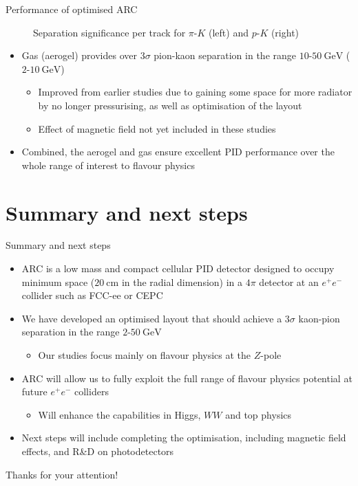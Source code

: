 \documentclass{beamer}
\begin{document}
\begin{frame}{Performance of optimised ARC}
\begin{figure}
\begin{subfigure}{0.5\textwidth}
    \end{subfigure}
    \vspace{-0.4cm}
    \caption{Separation significance per track for $\pi$-$K$ (left) and $p$-$K$ (right)}
  \end{figure}
  \vspace{-0.4cm}
  \begin{itemize}
    \setlength\itemsep{0.0em}
    \item{Gas (aerogel) provides over $3\sigma$ pion-kaon separation in the range $10$-$\SI{50}{\giga\eV}$ ($2$-$\SI{10}{\giga\eV}$)}
    \begin{itemize}
      \item{Improved from earlier studies due to gaining some space for more radiator by no longer pressurising, as well as optimisation of the layout}
      \item{Effect of magnetic field not yet included in these studies}
    \end{itemize}
    \item{Combined, the aerogel and gas ensure excellent PID performance over the whole range of interest to flavour physics}
  \end{itemize}
\end{frame}

\section{Summary and next steps}
\begin{frame}{Summary and next steps}
  \begin{itemize}
    \setlength\itemsep{1.0em}
    \item{ARC is a low mass and compact cellular PID detector designed to occupy minimum space ($\SI{20}{\centi\meter}$ in the radial dimension) in a $4\pi$ detector at an $e^+e^-$ collider such as FCC-ee or CEPC}
    \item{We have developed an optimised layout that should achieve a $3\sigma$ kaon-pion separation in the range $2$-$\SI{50}{\giga\eV}$}
    \begin{itemize}
      \item{Our studies focus mainly on flavour physics at the $Z$-pole}
    \end{itemize}
    \item{ARC will allow us to fully exploit the full range of flavour physics potential at future $e^+e^-$ colliders}
    \begin{itemize}
      \item{Will enhance the capabilities in Higgs, $WW$ and top physics}
    \end{itemize}
    \item{Next steps will include completing the optimisation, including magnetic field effects, and R\&D on photodetectors}
  \end{itemize}
  \begin{center}
    \huge Thanks for your attention!
  \end{center}
\end{frame}
\end{document}
